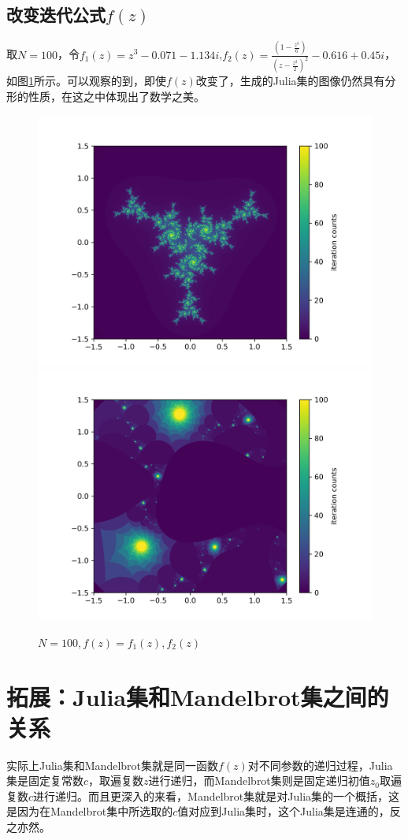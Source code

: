 \documentclass[a4paper]{ctexart}
\begin{document}
\subsection{改变迭代公式$f(z)$}
取$N=100$，令$f_1(z)=z^3-0.071-1.134i$,$\displaystyle f_2(z)=\frac{(1-\frac{z^3}{6})}{(z-\frac{z^2}{2})^2}-0.616+0.45i$\cite{julia_wiki}，如图\ref{tu4}所示。可以观察的到，即使$f(z)$改变了，生成的Julia集的图像仍然具有分形的性质，在这之中体现出了数学之美。
\begin{figure}[H]
	\centering
	\includegraphics[width=.45\textwidth]{../png/300dpi/julia_f1_N100.png}
	\includegraphics[width=.45\textwidth]{../png/300dpi/julia_f2_N100.png}
	\caption{$N=100,f(z)=f_1(z),f_2(z)$}
	\label{tu4}
\end{figure}

\section{拓展：Julia集和Mandelbrot集之间的关系}
实际上Julia集和Mandelbrot集就是同一函数$f(z)$对不同参数的递归过程，Julia集是固定复常数$c$，取遍复数$z$进行递归，而Mandelbrot集则是固定递归初值$z_0$取遍复数$c$进行递归。而且更深入的来看，Mandelbrot集就是对Julia集的一个概括\cite{julia_zhihuRe}，这是因为在Mandelbrot集中所选取的$c$值对应到Julia集时，这个Julia集是连通的，反之亦然。\cite{julia_Ju}
\end{document}
